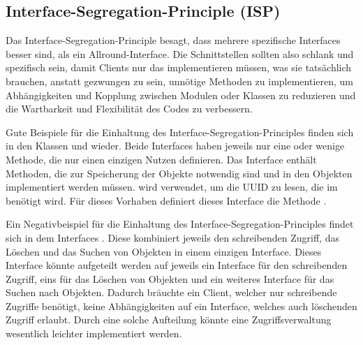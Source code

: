 \subsection{Interface-Segregation-Principle (ISP)}
Das Interface-Segregation-Principle besagt, dass mehrere spezifische Interfaces besser sind, als ein Allround-Interface. Die Schnittstellen sollten also schlank und spezifisch sein, damit Clients nur das implementieren müssen, was sie tatsächlich brauchen, anstatt gezwungen zu sein, unnötige Methoden zu implementieren, um Abhängigkeiten und Kopplung zwischen Modulen oder Klassen zu reduzieren und die Wartbarkeit und Flexibilität des Codes zu verbessern.

Gute Beispiele für die Einhaltung des Interface-Segregation-Principles finden sich in den Klassen \href{https://github.com/MichaelaHaag/RezeptApp/blob/main/1-Adapter/src/main/java/de/rezeptapp/adapter/Datenpersistenz/ICSVPersistierbar.java}{} und \href{https://github.com/MichaelaHaag/RezeptApp/tree/main/3-Domain-Code/src/main/java/de/rezeptapp/domain/IPersistierbar.java}{} wieder.
Beide Interfaces haben jeweils nur eine oder wenige Methode, die nur einen einzigen Nutzen definieren. Das Interface  enthält Methoden, die zur Speicherung der Objekte notwendig sind und in den Objekten implementiert werden müssen.  wird verwendet, um die UUID zu lesen, die im  benötigt wird. Für dieses Vorhaben definiert dieses Interface die Methode .

Ein Negativbeispiel für die Einhaltung des Interface-Segregation-Principles findet sich in dem Interfaces . Diese kombiniert jeweils den schreibenden Zugriff, das Löschen und das Suchen von Objekten in einem einzigen Interface. Dieses Interface könnte aufgeteilt werden auf jeweils ein Interface für den schreibenden Zugriff, eins für das Löschen von Objekten und ein weiteres Interface für das Suchen nach Objekten. Dadurch bräuchte ein Client, welcher nur schreibende Zugriffe benötigt, keine Abhängigkeiten auf ein Interface, welches auch löschenden Zugriff erlaubt. Durch eine solche Aufteilung könnte eine Zugriffsverwaltung wesentlich leichter implementiert werden.

